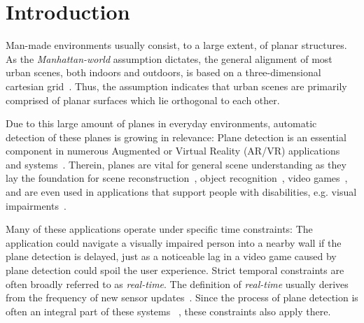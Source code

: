 \documentclass[main.tex]{subfiles}
\begin{document}
\setcounter{page}{1}
\chapter{Introduction}
\label{chap:Introduction}

Man-made environments usually consist, to a large extent, of planar structures.
As the \textit{Manhattan-world} assumption dictates, the general alignment of most urban scenes, both indoors and outdoors, is based on a three-dimensional cartesian grid~\cite{Coughlan_Yuille_1999}. Thus, the assumption indicates that urban scenes are primarily comprised of planar surfaces which lie orthogonal to each other.

Due to this large amount of planes in everyday environments, automatic detection of these planes is growing in relevance:
Plane detection is an essential component in numerous Augmented or Virtual Reality (AR/VR) applications and systems~\cite{Jurado_Jurado_Ortega_Feito_2021, sridhar2020instant}.
Therein, planes are vital for general scene understanding as they lay the foundation for scene reconstruction~\cite{agarwala2022planeformers}, object recognition~\cite{Peternell_Steiner_2004, Qian_Ye_2014}, video games~\cite{4538840}, and are even used in applications that support people with disabilities, e.g. visual impairments~\cite{visimpaired, Schwarze_Lauer_Schwaab_Romanovas_Bohm_Jurgensohn_2015}.


Many of these applications operate under specific time constraints: The application could navigate a visually impaired person into a nearby wall if the plane detection is delayed, just as a noticeable lag in a video game caused by plane detection could spoil the user experience.
Strict temporal constraints are often broadly referred to as \textit{real-time}.
The definition of \textit{real-time} usually derives from the frequency of new sensor updates~\cite{Davison_2003}.
Since the process of plane detection is often an integral part of these systems ~\cite{Wang_Bu_Zhang_Cheng_2022, https://doi.org/10.48550/arxiv.2209.08248, Kaess_2015}, these constraints also apply there.
\end{document}
